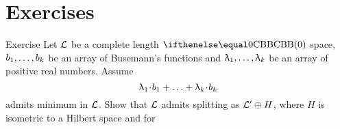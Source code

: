 \section{Exercises}

\begin{thm}{Exercise}
Let $\mathcal{L}$ be a complete length $\Alex{0}$ space,
$b_1,\dots,b_\kay$ be an array of Busemann's functions 
and $\lambda_1,\dots,\lambda_\kay$ be an array of positive real numbers.
Assume 
\[\lambda_1\cdot b_1+\dots+\lambda_\kay\cdot b_k\]
admits minimum in $\mathcal{L}$.
Show that $\mathcal{L}$ admits splitting as $\mathcal{L}'\oplus H$,
where $H$ is isometric to a Hilbert space and for 
\end{thm}


